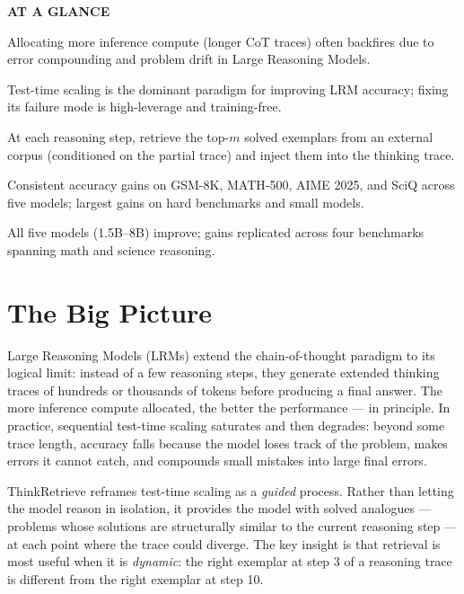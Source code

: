 \documentclass[10pt,twocolumn]{article}
\begin{document}
\begin{mdframed}[backgroundcolor=boxgray,linecolor=rulered,linewidth=1pt,
    innerleftmargin=6pt,innerrightmargin=6pt,
    innertopmargin=6pt,innerbottommargin=6pt]
\textbf{\small AT A GLANCE}\par\vspace{4pt}
\begin{description}[leftmargin=0pt,labelsep=4pt,itemsep=2pt,parsep=0pt,
    font=\small\bfseries]
  \item[Problem:] Allocating more inference compute (longer CoT traces) often
    backfires due to error compounding and problem drift in Large Reasoning Models.
  \item[Why it matters:] Test-time scaling is the dominant paradigm for improving LRM
    accuracy; fixing its failure mode is high-leverage and training-free.
  \item[Method:] At each reasoning step, retrieve the top-$m$ solved exemplars from an
    external corpus (conditioned on the partial trace) and inject them into the thinking trace.
  \item[Result:] Consistent accuracy gains on GSM-8K, MATH-500, AIME 2025, and SciQ
    across five models; largest gains on hard benchmarks and small models.
  \item[Evidence:] All five models (1.5B--8B) improve; gains replicated across four
    benchmarks spanning math and science reasoning.
\end{description}
\end{mdframed}

\section{The Big Picture}

Large Reasoning Models (LRMs) extend the chain-of-thought paradigm to its logical
limit: instead of a few reasoning steps, they generate extended thinking traces of
hundreds or thousands of tokens before producing a final answer. The more inference
compute allocated, the better the performance — in principle. In practice, sequential
test-time scaling saturates and then degrades: beyond some trace length, accuracy
falls because the model loses track of the problem, makes errors it cannot catch, and
compounds small mistakes into large final errors.

ThinkRetrieve reframes test-time scaling as a \emph{guided} process. Rather than
letting the model reason in isolation, it provides the model with solved analogues
— problems whose solutions are structurally similar to the current reasoning step —
at each point where the trace could diverge. The key insight is that retrieval is
most useful when it is \emph{dynamic}: the right exemplar at step 3 of a reasoning
trace is different from the right exemplar at step 10.
\end{document}
